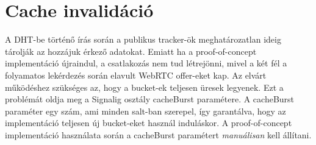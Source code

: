 \section{Cache invalidáció}\label{sec:cache-invalidáció}
A DHT-be történő írás során a publikus tracker-ök meghatározatlan ideig tárolják az hozzájuk érkező adatokat.
Emiatt ha a proof-of-concept implementáció újraindul, a csatlakozás nem tud létrejönni, mivel a két fél a folyamatos
lekérdezés során elavult WebRTC offer-eket kap.
Az elvárt működéshez szükséges az, hogy a bucket-ek teljesen üresek legyenek.
Ezt a problémát oldja meg a Signalig osztály cacheBurst paramétere.
A cacheBurst paraméter egy szám, ami minden salt-ban szerepel, így garantálva, hogy az implementáció teljesen új bucket-eket
használ induláskor.
A proof-of-concept implementáció használata során a cacheBurst paramétert \emph{manuálisan} kell állítani.

